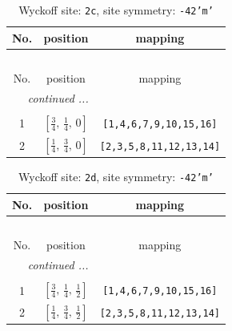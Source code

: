 \documentclass[fleqn,8pt]{jsarticle}
\begin{document}
\renewcommand{\arraystretch}{1.2}
\begin{longtable}{ccc}
\caption{Wyckoff site: {\tt 2c}, site symmetry: {\tt -42'm'}}
 \\
 \hline \hline
No. & position & mapping \\ \hline \endfirsthead

\multicolumn{2}{l}{\tablename\ \thetable{}} \\
 \hline \hline
No. & position & mapping \\ \hline \endhead

 \hline \hline
\multicolumn{2}{r}{\footnotesize\it continued ...} \\ \endfoot

 \hline \hline
\multicolumn{2}{r}{} \\ \endlastfoot

1 & $\left[ \frac{3}{4},\, \frac{1}{4},\, 0 \right]$ & {\tt [1,4,6,7,9,10,15,16]} \\ \hline
2 & $\left[ \frac{1}{4},\, \frac{3}{4},\, 0 \right]$ & {\tt [2,3,5,8,11,12,13,14]} \\
\end{longtable}
\renewcommand{\arraystretch}{1.2}
\begin{longtable}{ccc}
\caption{Wyckoff site: {\tt 2d}, site symmetry: {\tt -42'm'}}
 \\
 \hline \hline
No. & position & mapping \\ \hline \endfirsthead

\multicolumn{2}{l}{\tablename\ \thetable{}} \\
 \hline \hline
No. & position & mapping \\ \hline \endhead

 \hline \hline
\multicolumn{2}{r}{\footnotesize\it continued ...} \\ \endfoot

 \hline \hline
\multicolumn{2}{r}{} \\ \endlastfoot

1 & $\left[ \frac{3}{4},\, \frac{1}{4},\, \frac{1}{2} \right]$ & {\tt [1,4,6,7,9,10,15,16]} \\ \hline
2 & $\left[ \frac{1}{4},\, \frac{3}{4},\, \frac{1}{2} \right]$ & {\tt [2,3,5,8,11,12,13,14]} \\
\end{longtable}
\renewcommand{\arraystretch}{1.2}
\end{document}
